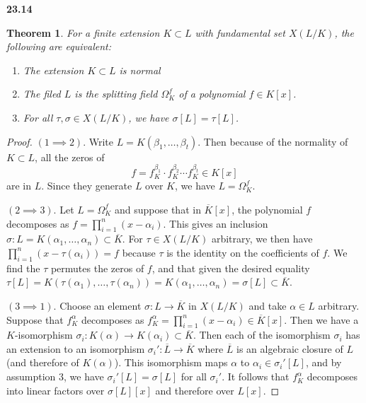 \documentclass{article}
\theoremstyle{plain}
\newtheorem*{theorem*}{Theorem}
\theoremstyle{remark}
\newenvironment{colbox}[1]
    {\newcommand\colboxcolor{B6D0DE}%
    \begin{lrbox}{\selvestebox}%
    \begin{minipage}{\dimexpr\columnwidth-2\fboxsep\relax}\textbf{#1}}
    {\vspace{0.5em}\end{minipage}\end{lrbox}%
    \begin{center}
    \colorbox[HTML]{\colboxcolor}{\usebox{\selvestebox}}
    \end{center}}
\begin{document}
    \begin{colbox}{23.14}
        \begin{theorem*}
            For a finite extension $K\subset L$ with fundamental set $X(L/K)$, the following are equivalent:
            \begin{enumerate}
                \item The extension $K\subset L$ is normal
                \item The filed $L$ is the splitting field $\Omega_K^f$ of a polynomial $f\in K[x]$.
                \item For all $\tau,\sigma\in X(L/K)$, we have $\sigma[L]=\tau[L]$.
            \end{enumerate}
        \end{theorem*}
    \end{colbox}
    \begin{proof}
        $(1\implies 2)$. Write $L=K(\beta_1,\dots, \beta_t)$. Then because of the normality of $K\subset L$,
        all the zeros of 
        $$f=f_K^{\beta_1}\cdot f_K^{\beta_2}\cdots f_K^{\beta_t}\in K[x]$$
        are in $L$. Since they generate $L$ over $K$, we have $L=\Omega_K^f$.
        
        $(2\implies 3)$. Let $L=\Omega_K^f$ and suppose that in $\overline{K}[x]$, the polynomial $f$ decomposes as $f=\prod_{i=1}^n (x-\alpha_i)$. 
        This gives an inclusion $\sigma:L=K(\alpha_1,\dots, \alpha_n)\subset\overline{K}$. For $\tau\in X(L/K)$ arbitrary, we then have $\prod_{i=1}^n(x-\tau(\alpha_i))=f$
        because $\tau$ is the identity on the coefficients of $f$. We find the $\tau$ permutes the zeros of $f$, and that given the desired equality $\tau[L]=K(\tau(\alpha_1),\dots,\tau(\alpha_n))=K(\alpha_1,\dots,\alpha_n)=\sigma[L]\subset\overline{K}$.

        $(3\implies 1)$. Choose an element $\sigma:L\to\overline{K}$ in $X(L/K)$ and take $\alpha\in L$ arbitrary. 
        Suppose that $f_K^\alpha$ decomposes as $f_K^\alpha=\prod_{i=1}^n(x-\alpha_i)\in\overline{K}[x]$. Then we have a $K$-isomorphism $\sigma_i:K(\alpha)\to K(\alpha_i)\subset\overline{K}$.
        Then each of the isomorphism $\sigma_i$ has an extension to an isomorphism $\sigma_i':\overline{L}\to\overline{K}$ where $\overline{L}$ is an algebraic closure of $L$ (and therefore of $K(\alpha)$).
        This isomorphism maps $\alpha$ to $\alpha_i\in\sigma_i'[L]$, and by assumption 3, we have $\sigma_i'[L]=\sigma[L]$ for all $\sigma_i'$. It follows that $f_K^\alpha$ decomposes into linear factors over $\sigma[L][x]$ and therefore over $L[x]$.
    \end{proof}
\end{document}
